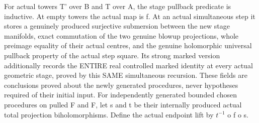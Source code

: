 \begin{definition}
\label{hir:submersion-choice-actual-stage-pullback}
\leanok
For actual towers T' over B and T over A, the stage pullback predicate is
inductive. At empty towers the actual map is f. At an actual simultaneous
step it stores a genuinely produced surjective submersion between the new
stage manifolds, exact commutation of the two genuine blowup projections,
whole preimage equality of their actual centres, and the genuine holomorphic
universal pullback property of the actual step square. Its strong marked
version additionally records the ENTIRE real controlled marked identity at
every actual geometric stage, proved by this SAME simultaneous recursion. These fields are
conclusions proved about the newly generated procedures, never hypotheses
required of their initial input.
For independently generated bounded chosen procedures on pulled F and F,
let s and t be their internally produced actual total projection
biholomorphisms. Define the actual endpoint lift by $t^{-1}$ o f o s.
\end{definition}

